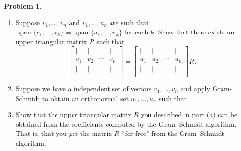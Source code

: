 \documentclass[12pt]{article}
\theoremstyle{definition}
\newtheorem{problem}{Problem}
\begin{document}
\clearpage
\begin{problem}~

    \begin{enumerate}
        \item  Suppose $v_1, \ldots, v_n$ and $v_1, \ldots, u_n$ are such that $\operatorname{span}\{v_1, \ldots, v_k\} = \operatorname{span}\{u_1, \ldots, u_k\}$ for each $k$.
        Show that there exists an \href{https://en.wikipedia.org/wiki/Triangular_matrix}{upper triangular} matrix $R$ such that 
        $$
        \begin{bmatrix}
            | & | & & | \\
            v_1 & v_2 & \cdots & v_n \\
            | & | & & | \\
        \end{bmatrix}
        =
        \begin{bmatrix}
            | & | & & | \\
            u_1 & u_2 & \cdots & u_n \\
            | & | & & | \\
        \end{bmatrix}
        R.
        $$
        \item 
    Suppose we have a independent set of vectors $v_1, \ldots, v_n$ and apply Gram-Schmidt to obtain an orthonormal set $u_1, \ldots, u_n$ such that 

        \begin{center}
        \end{center}

        \item Show that the upper triangular matrix $R$ you described in part (a) can be obtained from the coefficients computed by the Gram--Schmidt algorithm. 
        That is, that you get the matrix $R$ ``for free'' from the Gram--Schmidt algorithm.

    \end{enumerate}
\end{problem}
\end{document}
